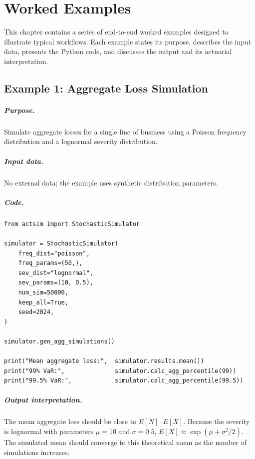 \chapter{Worked Examples}
\label{chap:worked_examples}

This chapter contains a series of end-to-end worked examples designed to
illustrate typical \actsim workflows. Each example states its purpose,
describes the input data, presents the Python code, and discusses the
output and its actuarial interpretation.

\section{Example 1: Aggregate Loss Simulation}
\label{ex:agg_loss}

\paragraph{Purpose.} Simulate aggregate losses for a single line of
business using a Poisson frequency distribution and a lognormal severity
distribution.

\paragraph{Input data.} No external data; the example uses synthetic
distribution parameters.

\paragraph{Code.}
\begin{lstlisting}[style=pythonstyle]
from actsim import StochasticSimulator

simulator = StochasticSimulator(
    freq_dist="poisson",
    freq_params=(50,),
    sev_dist="lognormal",
    sev_params=(10, 0.5),
    num_sim=50000,
    keep_all=True,
    seed=2024,
)

simulator.gen_agg_simulations()

print("Mean aggregate loss:",  simulator.results.mean())
print("99% VaR:",              simulator.calc_agg_percentile(99))
print("99.5% VaR:",            simulator.calc_agg_percentile(99.5))
\end{lstlisting}

\paragraph{Output interpretation.} The mean aggregate loss should be
close to $E[N] \cdot E[X]$. Because the severity is lognormal with
parameters $\mu = 10$ and $\sigma = 0.5$, $E[X] \approx
\exp(\mu + \sigma^{2}/2)$. The simulated mean should converge to this
theoretical mean as the number of simulations increases.

